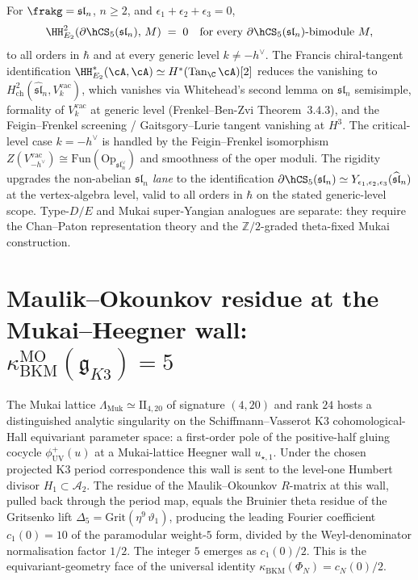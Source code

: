 \begin{theorem}
\label{thm:hh2-e2-rigidity-non-abelian-yangian}
For $\frakg = \mathfrak{sl}_n$, $n \geq 2$, and $\epsilon_1 + \epsilon_2 + \epsilon_3 = 0$,
\[
 \HH^2_{E_2}(\partial\hCS_5(\mathfrak{sl}_n),\, M) \;=\; 0 \quad\text{for every } \partial\hCS_5(\mathfrak{sl}_n)\text{-bimodule } M,
\]
to all orders in $\hbar$ and at every generic level $k \neq -h^\vee$.
The Francis chiral-tangent identification
$\HH^\ast_{E_2}(\cA, \cA) \simeq H^\ast(\mathrm{Tan}_\C\,\cA)[2]$
reduces the vanishing to
$H^2_{\mathrm{ch}}(\widehat{\mathfrak{sl}}_n, V^{\mathrm{vac}}_k)$,
which vanishes via Whitehead's second lemma on $\mathfrak{sl}_n$
semisimple, formality of $V^{\mathrm{vac}}_k$ at generic level
(Frenkel--Ben-Zvi Theorem~$3.4.3$), and the Feigin--Frenkel screening /
Gaitsgory--Lurie tangent vanishing at $H^3$. The critical-level case
$k = -h^\vee$ is handled by the Feigin--Frenkel isomorphism
$Z(V^{\mathrm{vac}}_{-h^\vee}) \cong \mathrm{Fun}(\mathrm{Op}_{\mathfrak{sl}_n^\vee})$
and smoothness of the oper moduli. The rigidity upgrades the
non-abelian \emph{$\mathfrak{sl}_n$ lane} to the identification
$\partial\hCS_5(\mathfrak{sl}_n) \simeq
Y_{\epsilon_1, \epsilon_2, \epsilon_3}(\widehat{\mathfrak{sl}}_n)$ at
the vertex-algebra level, valid to all orders in $\hbar$ on the stated
generic-level scope. Type-$D/E$ and Mukai super-Yangian analogues are
separate: they require the Chan--Paton representation theory and the
$\mathbb Z/2$-graded theta-fixed Mukai construction.
\end{theorem}

\section{Maulik--Okounkov residue at the Mukai--Heegner wall: \texorpdfstring{$\kappa_{\mathrm{BKM}}^{\mathrm{MO}}(\mathfrak{g}_{K3}) = 5$}{kappa-BKM-MO(g-K3) = 5}}
\label{sec:bl-mo-k3e-residue}

The Mukai lattice $\Lambda_{\mathrm{Muk}} \simeq \mathrm{II}_{4,20}$ of
signature $(4, 20)$ and rank $24$ hosts a distinguished analytic
singularity on the Schiffmann--Vasserot K3 cohomological-Hall
equivariant parameter space: a first-order pole of the positive-half
gluing cocycle $\phi^{+}_{\mathrm{UV}}(u)$ at a Mukai-lattice Heegner
wall $u_{\star, 1}$. Under the chosen projected K3 period correspondence this wall is sent to the
level-one Humbert divisor $H_{1} \subset \mathcal{A}_{2}$. The residue
of the Maulik--Okounkov $R$-matrix at this wall, pulled back through
the period map, equals the Bruinier theta residue of the Gritsenko
lift $\Delta_{5} = \mathrm{Grit}(\eta^{9}\,\vartheta_{1})$, producing
the leading Fourier coefficient $c_{1}(0) = 10$ of the paramodular
weight-$5$ form, divided by the Weyl-denominator normalisation factor
$1/2$. The integer $5$ emerges as $c_{1}(0)/2$. This is the
equivariant-geometry face of the universal identity
$\kappa_{\mathrm{BKM}}(\Phi_{N}) = c_{N}(0)/2$.


